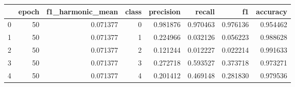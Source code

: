 \begin{tabular}{lrrrrrrr}
\toprule
 & epoch & f1_harmonic_mean & class & precision & recall & f1 & accuracy \\
\midrule
0 & 50 & 0.071377 & 0 & 0.981876 & 0.970463 & 0.976136 & 0.954462 \\
1 & 50 & 0.071377 & 1 & 0.224966 & 0.032126 & 0.056223 & 0.988628 \\
2 & 50 & 0.071377 & 2 & 0.121244 & 0.012227 & 0.022214 & 0.991633 \\
3 & 50 & 0.071377 & 3 & 0.272718 & 0.593527 & 0.373718 & 0.973271 \\
4 & 50 & 0.071377 & 4 & 0.201412 & 0.469148 & 0.281830 & 0.979536 \\
\bottomrule
\end{tabular}
